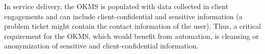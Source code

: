 
In service delivery, the OKMS is populated with data collected in client
engagements and can include client-confidential and sensitive information (\eg a
problem ticket might contain the contact information of the user). Thus, a
critical requirement for the OKMS, which would benefit from automation, is
cleansing or anonymization of sensitive and client-confidential information.



